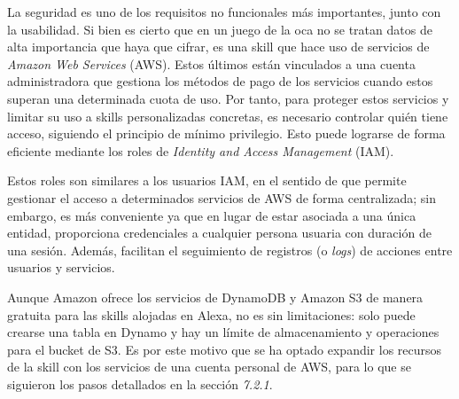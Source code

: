 La seguridad es uno de los requisitos no funcionales más importantes, junto con la usabilidad. Si bien es cierto que en un juego de la oca no se tratan datos de alta importancia que haya que cifrar, es una skill que hace uso de servicios de \textit{Amazon Web Services} (AWS). Estos últimos están vinculados a una cuenta administradora que gestiona los métodos de pago de los servicios cuando estos superan una determinada cuota de uso. Por tanto, para proteger estos servicios y limitar su uso a skills personalizadas concretas, es necesario controlar quién tiene acceso, siguiendo el principio de mínimo privilegio. Esto puede lograrse de forma eficiente mediante los roles de \textit{Identity and Access Management} (IAM).

Estos roles son similares a los usuarios IAM, en el sentido de que permite gestionar el acceso a determinados servicios de AWS de forma centralizada; sin embargo, es más conveniente ya que en lugar de estar asociada a una única entidad, proporciona credenciales a cualquier persona usuaria con duración de una sesión. Además, facilitan el seguimiento de registros (o \textit{logs}) de acciones entre usuarios y servicios.

Aunque Amazon ofrece los servicios de DynamoDB y Amazon S3 de manera gratuita para las skills alojadas en Alexa, no es sin limitaciones: solo puede crearse una tabla en Dynamo y hay un límite de almacenamiento y operaciones para el bucket de S3. Es por este motivo que se ha optado expandir los recursos de la skill con los servicios de una cuenta personal de AWS, para lo que se siguieron los pasos detallados en la sección \textit{7.2.1}.

